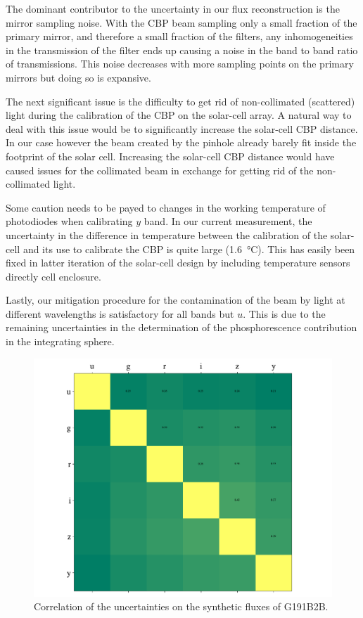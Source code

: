 The dominant contributor to the uncertainty in our flux reconstruction
is the mirror sampling noise. With the CBP beam sampling only a small
fraction of the primary mirror, and therefore a small fraction of the
filters, any inhomogeneities in the transmission of the filter ends up
causing a noise in the band to band ratio of transmissions. This noise
decreases with more sampling points on the primary mirrors but doing
so is expansive.

The next significant issue is the difficulty to get rid of
non-collimated (scattered) light during the calibration of the CBP on
the solar-cell array. A natural way to deal with this issue would be
to significantly increase the solar-cell CBP distance. In our case
however the beam created by the \bpinhole pinhole already barely fit
inside the footprint of the solar cell. Increasing the solar-cell CBP
distance would have caused issues for the collimated beam in exchange
for getting rid of the non-collimated light.

Some caution needs to be payed to changes in the working temperature
of photodiodes when calibrating $y$ band. In our current measurement,
the uncertainty in the difference in temperature between the
calibration of the solar-cell and its use to calibrate the CBP is
quite large (\SI{1.6}{\celsius}). This has easily been fixed in latter
iteration of the solar-cell design by including temperature sensors
directly cell enclosure.

Lastly, our mitigation procedure for the contamination of the beam by
light at different wavelengths is satisfactory for all bands but
$u$. This is due to the remaining uncertainties in the determination
of the phosphorescence contribution in the integrating sphere.

\begin{figure}
  \centering
  \includegraphics[width=1\linewidth]{fig/bandcorrelation.pdf}
  \caption{Correlation of the uncertainties on the synthetic fluxes of G191B2B.}
  \label{fig:correlation}
\end{figure}

